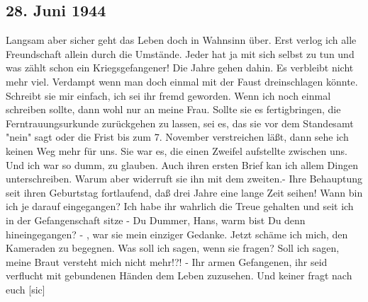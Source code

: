 \subsection{28. Juni 1944}

Langsam aber sicher geht das Leben doch in Wahnsinn \"{u}ber.
Erst verlog ich alle Freundschaft allein durch die Umst\"{a}nde.
Jeder hat ja mit sich selbst zu tun und was z\"{a}hlt schon ein Kriegsgefangener!
Die Jahre gehen dahin.
Es verbleibt nicht mehr viel.
Verdampt wenn man doch einmal mit der Faust dreinschlagen k\"{o}nnte.
Schreibt sie mir einfach, ich sei ihr fremd geworden.
Wenn ich noch einmal schreiben sollte, dann wohl nur an meine Frau.
Sollte sie es fertigbringen, die Ferntrauungsurkunde zur\"{u}ckgehen zu lassen, sei es, das sie vor dem Standesamt "nein" sagt oder die Frist bis zum 7. November verstreichen l\"{a}{\ss}t, dann sehe ich keinen Weg mehr f\"{u}r uns.
Sie war es, die einen Zweifel aufstellte zwischen uns.
Und ich war so dumm, zu glauben.
Auch ihren ersten Brief kan ich allem Dingen unterschreiben.
Warum aber widerruft sie ihn mit dem zweiten.-
Ihre Behauptung seit ihren Geburtstag fortlaufend, da{\ss} drei Jahre eine lange Zeit seihen!
Wann bin ich je darauf eingegangen?
Ich habe ihr wahrlich die Treue gehalten und seit ich in der Gefangenschaft sitze - Du Dummer, Hans, warm bist Du denn hineingegangen? - , war sie mein einziger Gedanke.
Jetzt sch\"{a}me ich mich, den Kameraden zu begegnen.
Was soll ich sagen, wenn sie fragen?
Soll ich sagen, meine Braut versteht mich nicht mehr!?!
- Ihr armen Gefangenen, ihr seid verflucht mit gebundenen H\"{a}nden dem Leben zuzusehen.
Und keiner fragt nach euch{\color{red} [sic] }

\clearpage
